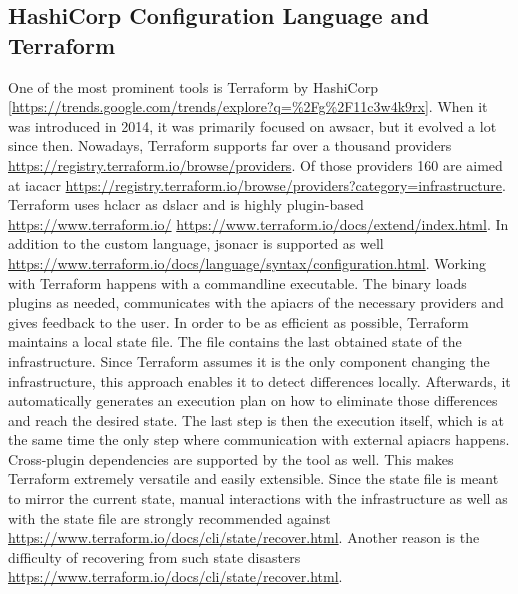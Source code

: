 
\subsection{HashiCorp Configuration Language and Terraform}
One of the most prominent tools is Terraform by HashiCorp [\url{https://trends.google.com/trends/explore?q=%2Fg%2F11c3w4k9rx}]. When it was introduced in 2014, it was primarily focused on \gls{awsacr}, but it evolved a lot since then. Nowadays, Terraform supports far over a thousand providers \url{https://registry.terraform.io/browse/providers}. Of those providers \textquote{only} 160 are aimed at \gls{iacacr} \url{https://registry.terraform.io/browse/providers?category=infrastructure}. Terraform uses \gls{hclacr} as \gls{dslacr} and is highly plugin-based \url{https://www.terraform.io/} \url{https://www.terraform.io/docs/extend/index.html}. In addition to the custom language, \gls{jsonacr} is supported as well \url{https://www.terraform.io/docs/language/syntax/configuration.html}.
\newline
Working with Terraform happens with a commandline executable. The binary loads plugins as needed, communicates with the \gls{apiacr}s of the necessary providers and gives feedback to the user. In order to be as efficient as possible, Terraform maintains a local state file. The file contains the last obtained state of the infrastructure. Since Terraform assumes it is the only component changing the infrastructure, this approach enables it to detect differences locally. Afterwards, it automatically generates an execution plan on how to eliminate those differences and reach the desired state. The last step is then the execution itself, which is at the same time the only step where communication with external \gls{apiacr}s happens.
\newline
Cross-plugin dependencies are supported by the tool as well. This makes Terraform extremely versatile and easily extensible.
\newline
Since the state file is meant to mirror the current state, manual interactions with the infrastructure as well as with the state file are strongly recommended against \url{https://www.terraform.io/docs/cli/state/recover.html}. Another reason is the difficulty of recovering from such state disasters \url{https://www.terraform.io/docs/cli/state/recover.html}.

